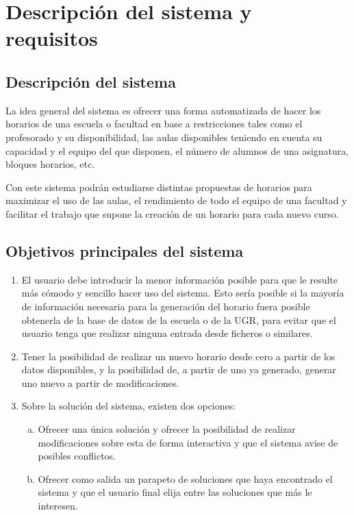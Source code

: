 \chapter{Descripción del sistema y requisitos}

\section{Descripción del sistema}

La idea general del sistema es ofrecer una forma automatizada de hacer los horarios de una escuela o facultad en base a restricciones tales como el profesorado y su disponibilidad, las aulas disponibles teniendo en cuenta su capacidad y el equipo del que disponen, el número de alumnos de una asignatura, bloques horarios, etc. 

Con este sistema podrán estudiarse distintas propuestas de horarios para maximizar el uso de las aulas, el rendimiento de todo el equipo de una facultad y facilitar el trabajo que supone la creación de un horario para cada nuevo curso.

\section{Objetivos principales del sistema}

\begin{enumerate}[OBJ-1]
    \item El usuario debe introducir la menor información posible para que le resulte más cómodo y sencillo hacer uso del sistema. Esto sería posible si la mayoría de información necesaria para la generación del horario fuera posible obtenerla de la base de datos de la escuela o de la UGR, para evitar que el usuario tenga que realizar ninguna entrada desde ficheros o similares.
    
    \item Tener la posibilidad de realizar un nuevo horario desde cero a partir de los datos disponibles, y la posibilidad de, a partir de uno ya generado, generar uno nuevo a partir de modificaciones.

    \item Sobre la solución del sistema, existen dos opciones:
    \begin{enumerate}[a)]
        \item Ofrecer una única solución y ofrecer la posibilidad de realizar modificaciones sobre esta de forma interactiva y que el sistema avise de posibles conflictos.
        \item Ofrecer como salida un parapeto de soluciones que haya encontrado el sistema y que el usuario final elija entre las soluciones que más le interesen.
    \end{enumerate}
\end{enumerate}
